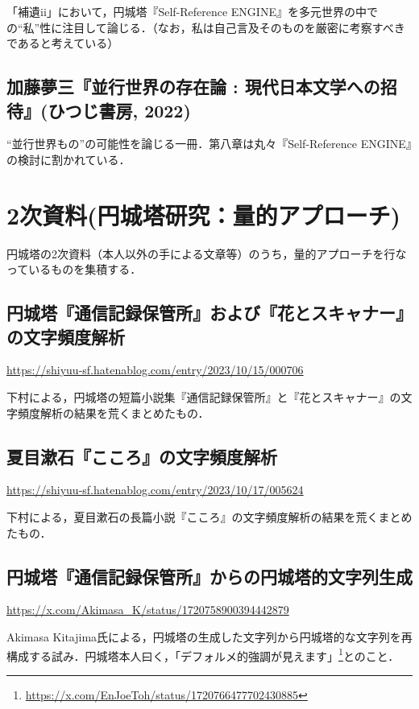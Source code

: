 \documentclass[10pt, a5paper, twoside]{jsarticle}
\theoremstyle{definition}
\begin{document}
			「補遺ii」において，円城塔『Self-Reference ENGINE』を多元世界の中での“私”性に注目して論じる．（なお，私は自己言及そのものを厳密に考察すべきであると考えている）

		\subsection{加藤夢三『並行世界の存在論 : 現代日本文学への招待』(ひつじ書房, 2022)}

			“並行世界もの”の可能性を論じる一冊．第八章は丸々『Self-Reference ENGINE』の検討に割かれている．

	\section{2次資料(円城塔研究：量的アプローチ)}

		円城塔の2次資料（本人以外の手による文章等）のうち，量的アプローチを行なっているものを集積する．

		\subsection{円城塔『通信記録保管所』および『花とスキャナー』の文字頻度解析}

			\url{https://shiyuu-sf.hatenablog.com/entry/2023/10/15/000706}

			下村による，円城塔の短篇小説集『通信記録保管所』と『花とスキャナー』の文字頻度解析の結果を荒くまとめたもの．

		\subsection{夏目漱石『こころ』の文字頻度解析}

			\url{https://shiyuu-sf.hatenablog.com/entry/2023/10/17/005624}

			下村による，夏目漱石の長篇小説『こころ』の文字頻度解析の結果を荒くまとめたもの．

		\subsection{円城塔『通信記録保管所』からの円城塔的文字列生成}

			\url{https://x.com/Akimasa_K/status/1720758900394442879}

			Akimasa Kitajima氏による，円城塔の生成した文字列から円城塔的な文字列を再構成する試み．円城塔本人曰く，「デフォルメ的強調が見えます」\footnote{\url{https://x.com/EnJoeToh/status/1720766477702430885}}とのこと．
\end{document}
